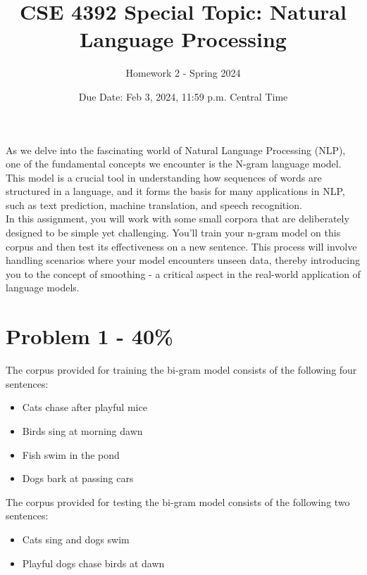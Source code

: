 \documentclass{article}
\begin{document}
\title{CSE 4392 Special Topic: Natural Language Processing}
\author{Homework 2 - Spring 2024}
\date{Due Date: Feb 3, 2024, 11:59 p.m. Central Time}
\maketitle
\thispagestyle{fancy}




As we delve into the fascinating world of Natural Language Processing (NLP), one of the fundamental concepts we encounter is the N-gram language model. This model is a crucial tool in understanding how sequences of words are structured in a language, and it forms the basis for many applications in NLP, such as text prediction, machine translation, and speech recognition.\\
\newline
In this assignment, you will work with some small corpora that are deliberately 
designed to be simple yet challenging. You'll train your n-gram model on this corpus and then test its effectiveness on a new sentence. This process will involve handling scenarios where your model encounters unseen data, thereby introducing you to the concept of smoothing - a critical aspect in the real-world application of language models.\\

\section*{Problem 1 - 40\%}
The corpus provided for training the bi-gram model consists of the following four sentences:

\begin{itemize}
    \item Cats chase after playful mice
    \item Birds sing at morning dawn
    \item Fish swim in the pond
    \item Dogs bark at passing cars
\end{itemize}

The corpus provided for testing the bi-gram model consists of the following two sentences:

\begin{itemize}
    \item Cats sing and dogs swim
    \item Playful dogs chase birds at dawn
\end{itemize}
\end{document}

